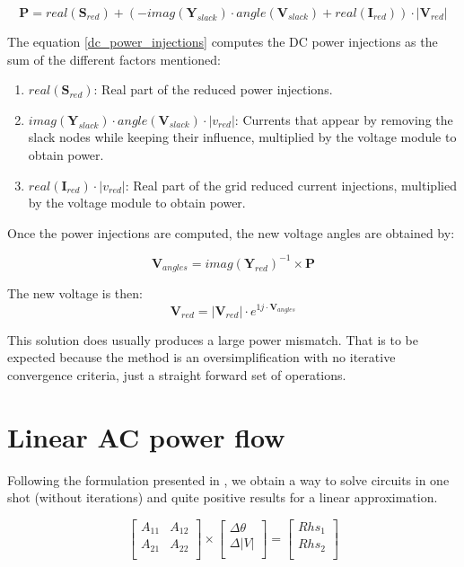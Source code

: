 \documentclass[11pt,fleqn]{book} %
\begin{document}
\begin{equation}
\textbf{P} = real(\textbf{S}_{red}) + (- imag(\textbf{Y}_{slack}) \cdot angle(\textbf{V}_{slack}) + real(\textbf{I}_{red})) \cdot |\textbf{V}_{red}|
\label{dc_power_injections}
\end{equation}

The equation \ref{dc_power_injections} computes the DC power injections as the sum of the different factors mentioned:

\begin{enumerate}
	\item $real(\textbf{S}_{red})$: Real part of the reduced power injections.
	\item $imag(\textbf{Y}_{slack}) \cdot angle(\textbf{V}_{slack}) \cdot |v_{red}|$: Currents that appear by removing the slack nodes while keeping their influence, multiplied by the voltage module to obtain power.
	\item $real(\textbf{I}_{red}) \cdot |v_{red}|$: Real part of the grid reduced current injections, multiplied by the voltage module to obtain power.
\end{enumerate}

Once the power injections are computed, the new voltage angles are obtained by:

\begin{equation}
\textbf{V}_{angles} = imag(\textbf{Y}_{red})^{-1} \times \textbf{P}
\end{equation}

The new voltage is then:
\begin{equation}
\textbf{V}_{red} = |\textbf{V}_{red}| \cdot e^{1j \cdot  \textbf{V}_{angles}}
\end{equation}

This solution does usually produces a large power mismatch. That is to be expected because the method is an oversimplification with no iterative convergence criteria, just a straight forward set of operations.

\newpage
\section{Linear AC power flow}

Following the formulation presented in \cite{rossoni2016linearized}, we obtain a way to solve circuits in one shot (without iterations) and quite positive results for a linear approximation.

\begin{equation}
\begin{bmatrix}
A_{11} & A_{12} \\
A_{21} & A_{22} \\
\end{bmatrix}
\times
\begin{bmatrix}
\Delta \theta\\
\Delta |V|\\
\end{bmatrix}
=
\begin{bmatrix}
Rhs_1\\
Rhs_2\\
\end{bmatrix}
\end{equation}
\end{document}
